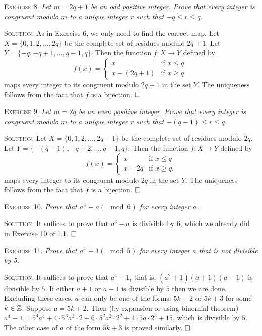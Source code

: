 \documentclass[11pt, leqno]{article}
\newcommand{\done}{\ensuremath{\hfill\square}}
\begin{document}
\textsc{Exercise 8}. \emph{Let $m = 2q + 1$ be an odd positive integer. Prove that every integer is congruent modulo $m$ to a unique integer $r$ such that $-q \leq r \leq q$.}

\textsc{Solution}. As in Exercise 6, we only need to find the correct map. Let $X=\{0,1,2,\ldots, 2q\}$ be the complete set of residues modulo $2q+1$. Let $Y = \{-q,-q+1,\ldots,q-1,q\}$. Then the function $f:X\to Y$ defined by 
\begin{displaymath}
f(x) =
\begin{cases}
  x & \text{if } x\leq q \\
  x-(2q+1) & \text{if } x\geq q.
\end{cases}
\end{displaymath}
maps every integer to its congruent modulo $2q+1$ in the set $Y$. The uniqueness follows from the fact that $f$ is a bijection. \done

\textsc{Exercise 9}. \emph{Let $m=2q$ be an even positive integer. Prove that every integer is congruent modulo $m$ to a unique integer $r$ such that $-(q-1) \leq r \leq q$.}

\textsc{Solution}. Let $X=\{0,1,2,\ldots,2q-1\}$ be the complete set of residues modulo $2q$. Let $Y=\{-(q-1),-q+2,\ldots,q-1,q\}$. Then the function $f:X\to Y$ defined by 
\begin{displaymath}
f(x) =
\begin{cases}
  x & \text{if } x \leq q \\
  x-2q & \text{if } x\geq q.
\end{cases}
\end{displaymath}
maps every integer to its congruent modulo $2q$ in the set $Y$. The uniqueness follows from the fact that $f$ is a bijection. \done

\textsc{Exercise 10}. \emph{Prove that $a^3 \equiv a (\mod 6)$ for every integer $a$.}

\textsc{Solution}. It suffices to prove that $a^3-a$ is divisible by $6$, which we already did in Exercise 10 of 1.1. \done

\textsc{Exercise 11}. \emph{Prove that $a^4\equiv 1 (\mod 5)$ for every integer $a$ that is not divisible by 5.}

\textsc{Solution}. It suffices to prove that $a^4-1$, that is, $(a^2+1)(a+1)(a-1)$ is divisible by $5$. If either $a+1$ or $a-1$ is divisible by $5$ then we are done. Excluding these cases, $a$ can only be one of the forms: $5k+2$ or $5k+3$ for some $k\in\mathbb{Z}$. Suppose $a=5k+2$. Then (by expansion or using binomial theorem) $a^4-1 = 5^4a^4 + 4\cdot 5^3a^3 \cdot 2 + 6\cdot 5^2a^2\cdot 2^2 + 4\cdot 5a\cdot 2^3 + 15$, which is divisible by $5$. The other case of $a$ of the form $5k+3$ is proved similarly. \done
\end{document}
